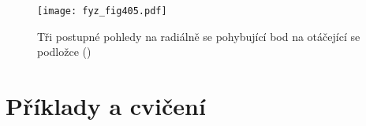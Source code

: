     \begin{figure}[ht!] %
      \centering
      \texttt{[image: fyz\_fig405.pdf]}
      \caption{Tři postupné pohledy na radiálně se pohybující bod na otáčející se podložce
              (\cite[s.~269]{Feynman01})}
      \label{fyz:fig405}
    \end{figure}
  \section{Příklady a cvičení}\label{fyz:IchapXIXsecV}

